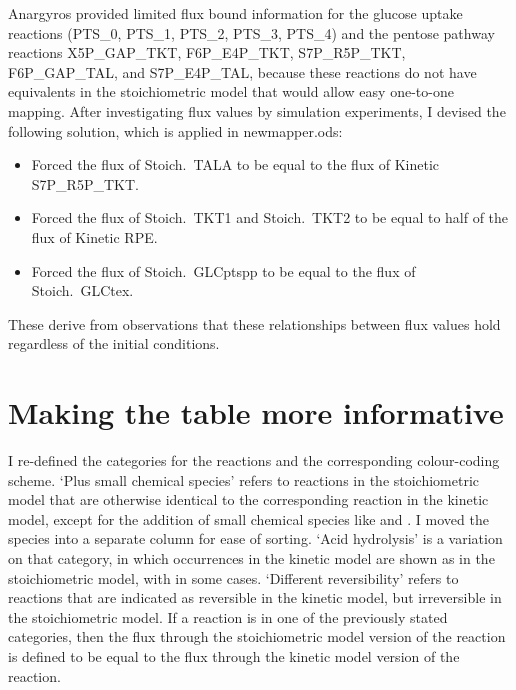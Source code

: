 \documentclass[parskip=full]{scrartcl}
\begin{document}
Anargyros provided limited flux bound information for the glucose uptake reactions (PTS\_0, PTS\_1, PTS\_2, PTS\_3, PTS\_4) and the pentose pathway reactions X5P\_GAP\_TKT, F6P\_E4P\_TKT, S7P\_R5P\_TKT, F6P\_GAP\_TAL, and S7P\_E4P\_TAL, because these reactions do not have equivalents in the stoichiometric model that would allow easy one-to-one mapping. After investigating flux values by simulation experiments, I devised the following solution, which is applied in newmapper.ods:

\begin{itemize}
\item Forced the flux of Stoich.\ TALA to be equal to the flux of Kinetic S7P\_R5P\_TKT.
\item Forced the flux of Stoich.\ TKT1 and Stoich.\ TKT2 to be equal to half of the flux of Kinetic RPE.
\item Forced the flux of Stoich.\ GLCptspp to be equal to the flux of Stoich.\ GLCtex.
\end{itemize}

These derive from observations that these relationships between flux values hold regardless of the initial conditions.

\section{Making the table more informative}
\label{sec:moreinformative}

I re-defined the categories for the reactions and the corresponding colour-coding scheme. `Plus small chemical species' refers to reactions in the stoichiometric model that are otherwise identical to the corresponding reaction in the kinetic model, except for the addition of small chemical species like  and . I moved the species into a separate column for ease of sorting. `Acid hydrolysis' is a variation on that category, in which  occurrences in the kinetic model are shown as  in the stoichiometric model, with  in some cases. `Different reversibility' refers to reactions that are indicated as reversible in the kinetic model, but irreversible in the stoichiometric model. If a reaction is in one of the previously stated categories, then the flux through the stoichiometric model version of the reaction is defined to be equal to the flux through the kinetic model version of the reaction.
\end{document}
